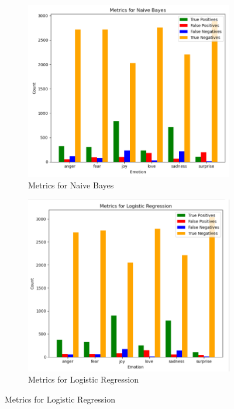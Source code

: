 \begin{figure}[h!]
	\centering
	\begin{subfigure}[b]{0.45\textwidth}
		\centering
		\includegraphics[width=\textwidth]{images/metrics_naive_bayes.png}
		\caption{Metrics for Naive Bayes}
		\label{fig:metrics_evaluation_naive_bayes}
	\end{subfigure}
	\hfill
	\begin{subfigure}[b]{0.45\textwidth}
		\centering
		\includegraphics[width=\textwidth]{images/metrics_logistic_regression.png}
		\caption{Metrics for Logistic Regression}
		\label{fig:metrics_evaluation_logistic_regression}
	\end{subfigure}
	

\end{figure}
